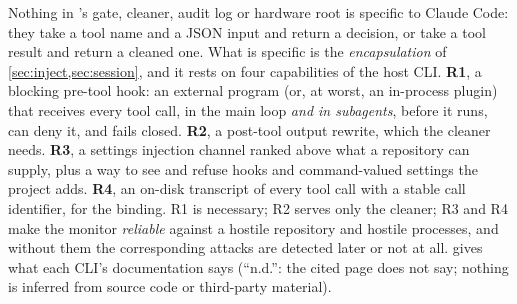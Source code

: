 
Nothing in \cz{}'s gate, cleaner, audit log or hardware root is specific
to Claude Code: they take a tool name and a JSON input and return a
decision, or take a tool result and return a cleaned one. What is
specific is the \emph{encapsulation} of \cref{sec:inject,sec:session},
and it rests on four capabilities of the host CLI. \textbf{R1}, a
blocking pre-tool hook: an external program (or, at worst, an in-process
plugin) that receives every tool call, in the main loop \emph{and in
subagents}, before it runs, can deny it, and fails closed. \textbf{R2}, a
post-tool output rewrite, which the cleaner needs. \textbf{R3}, a settings
injection channel ranked above what a repository can supply, plus a way
to see and refuse hooks and command-valued settings the project adds.
\textbf{R4}, an on-disk transcript of every tool call with a stable call
identifier, for the binding. R1 is necessary; R2 serves only the cleaner;
R3 and R4 make the monitor \emph{reliable} against a hostile repository
and hostile processes, and without them the corresponding attacks are
detected later or not at all.  gives what each
CLI's documentation says (``n.d.'': the cited page does not say;
nothing is inferred from source code or third-party material).

